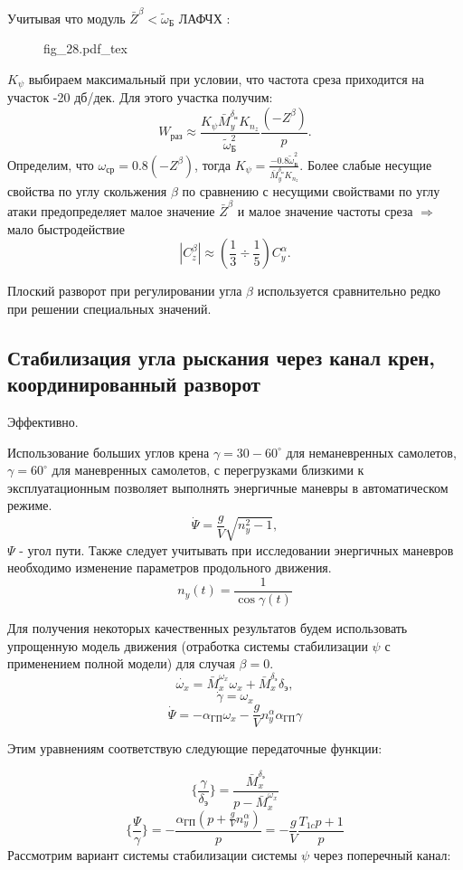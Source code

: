 \documentclass{article}
\begin{document}
Учитывая что модуль $\bar{Z}^\beta < \tilde{\omega}_\text{Б}$
ЛАФЧХ :
\begin{figure}[H]
	\centering
	{fig_28.pdf_tex}
\end{figure}

$K_{\psi}$ выбираем максимальный при условии, что частота среза приходится на
участок -20 дб/дек. Для этого участка получим:
\[
	W_\text{раз} \approx \frac{K_{\psi}\bar{M}_y^{\delta_\text{н}}
	K_{n_z}}{\tilde{\omega}_\text{Б}^2}\frac{(-Z^\beta)}{p}.
\]
Определим, что $\omega_\text{ср} = 0.8(-Z^\beta)$, тогда $K_{\psi}=\frac{-0.8
	\tilde{\omega}_\text{Б}^2}{\bar{M}_y^{\delta_\text{н}} K_{n_z}}$.
Более слабые несущие свойства по углу скольжения $\beta$ по сравнению с
несущими свойствами по углу атаки предопределяет малое значение $\bar{Z}^\beta$
и малое значение частоты среза $\Rightarrow$ мало быстродействие
\[
	|C_z^\beta| \approx (\frac{1}{3} \div\frac{1}{5}) C_y^\alpha.
\]

Плоский разворот при регулировании угла $\beta$ используется сравнительно редко
при решении специальных значений.

\subsection{Стабилизация угла рыскания через канал крен, координированный
	разворот}
Эффективно.


Использование больших углов крена $\gamma = 30 - 60^\circ$ для неманевренных
самолетов, $\gamma = 60^\circ$ для маневренных самолетов, с перегрузками
близкими к эксплуатационным позволяет выполнять энергичные маневры в
автоматическом режиме.
\[
	\dot{\Psi} =\frac{g}{V} \sqrt{n_y^2 -1},
\]
$\Psi$ - угол пути. Также следует учитывать при исследовании энергичных
маневров необходимо изменение параметров продольного движения.
\[
	n_y(t) =\frac{1}{\cos{\gamma(t)}}
\]

Для получения некоторых качественных результатов будем использовать упрощенную
модель движения (отработка системы стабилизации $\psi$ с применением полной
модели) для случая $\beta = 0$.
\[
	\dot{\omega_x} =\bar{M}_x^{\omega_x} \omega_x
	+\bar{M}_{x}^{\delta_\text{э}} \delta_\text{э},
\]
\[
	\dot{\gamma} = \omega_x
\]
\[
	\dot{\Psi} = - \alpha_\text{ГП}\omega_x - \frac{g}{V} n_y^\alpha
	\alpha_\text{ГП}\gamma
\]

Этим уравнениям соответствую следующие передаточные функции:

\[
	\{\frac{\gamma}{\delta_\text{э}} \} =\frac{\bar{M}_{x}^{\delta_\text{э}}}{p
	-\bar{M}_x^{\omega_x}}
\]
\[
	\{\frac{\Psi}{\gamma}\} = - \frac{\alpha_\text{ГП} (p +
		\frac{g}{V}n_y^\alpha)}{p} = -\frac{g}{V} \frac{T_{1c}p + 1}{p}
\]
Рассмотрим вариант системы стабилизации системы $\psi$ через поперечный канал:
\end{document}

